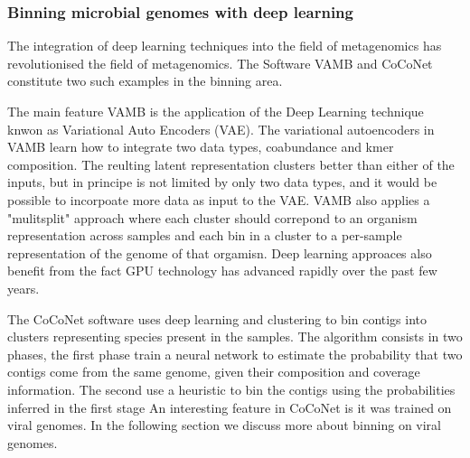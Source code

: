 \documentclass{article}
\begin{document}

\subsubsection{Binning microbial genomes with deep learning}
The integration of deep learning techniques into the field of metagenomics has revolutionised the field of metagenomics. The Software VAMB and CoCoNet constitute two such examples in the binning area.

The main feature VAMB is the application of the Deep Learning technique knwon as Variational Auto Encoders (VAE). The variational autoencoders in VAMB learn how to integrate two data types, coabundance and kmer composition. The reulting latent representation clusters better than either of the inputs, but in principe is not limited by only two data types, and it would be possible to incorpoate more data as input to the VAE.
VAMB also applies a "mulitsplit" approach where each cluster should correpond to an organism representation across samples and each bin in a cluster to a per-sample representation of the genome of that orgamisn.
Deep learning approaces also benefit from the fact GPU technology has advanced rapidly over the past few years.

The CoCoNet software uses deep learning and clustering to bin contigs into clusters representing species present in the samples.
The algorithm consists in two phases, the first phase train a neural network to estimate the probability that two contigs come from the same genome, given their composition and coverage information. The second use a heuristic to bin the contigs using the probabilities inferred in the first stage
An interesting feature in CoCoNet is it was trained on viral genomes. In the following section we discuss more about binning on viral genomes. 
\end{document}
